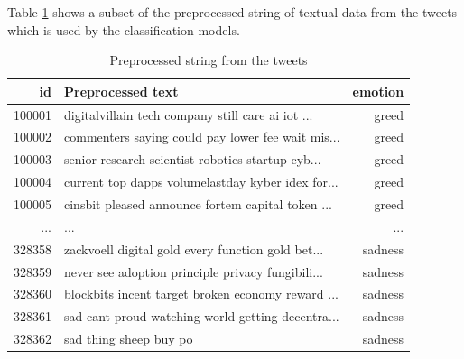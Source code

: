 \documentclass[a4paper, 12pt]{article}
\begin{document}
Table \ref{tab:cleanedtext} shows a subset of the preprocessed string of textual data from the tweets which is used by the classification models.
\begin{table}[h]
\begin{center}
    \begin{tabular}{| r | l | r |}
        \hline
        id  				& Preprocessed text    												&emotion		\\ \hline
        100001       & digitalvillain tech company still care ai iot ...     & greed \\ \hline
        100002       & commenters saying could pay lower fee wait mis... 	 & greed\\ \hline
        100003       & senior research scientist robotics startup cyb...     & greed \\ \hline
        100004       & current top dapps volumelastday kyber idex for...   & greed  \\ \hline
        100005       & cinsbit pleased announce fortem capital token ...   & greed   \\ \hline
				...     & ...																										& ...	\\ \hline
        328358       & zackvoell digital gold every function gold bet...   & sadness    \\ \hline
        328359       & never see adoption principle privacy fungibili...   & sadness  \\ \hline
        328360       & blockbits incent target broken economy reward ...    & sadness   \\ \hline
        328361       & sad cant proud watching world getting decentra...     & sadness    \\ \hline
        328362       & sad thing sheep buy po												      & sadness\\ \hline
    \end{tabular}
    \caption{Preprocessed string from the tweets }
    \label{tab:cleanedtext}
\end{center}
\end{table}
\end{document}
